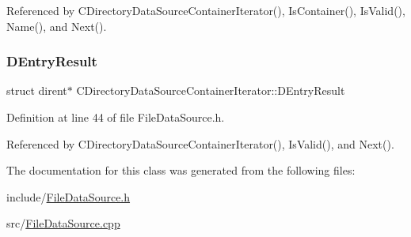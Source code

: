 Referenced by C\+Directory\+Data\+Source\+Container\+Iterator(), Is\+Container(), Is\+Valid(), Name(), and Next().

\hypertarget{classCDirectoryDataSourceContainerIterator_a7e8c1c50ef09013ee6013dcbd1bdc616}{}\label{classCDirectoryDataSourceContainerIterator_a7e8c1c50ef09013ee6013dcbd1bdc616} 
\subsubsection{\texorpdfstring{D\+Entry\+Result}{DEntryResult}}
{\footnotesize\ttfamily struct dirent$\ast$ C\+Directory\+Data\+Source\+Container\+Iterator\+::\+D\+Entry\+Result\hspace{0.3cm}{\ttfamily [protected]}}



Definition at line 44 of file File\+Data\+Source.\+h.



Referenced by C\+Directory\+Data\+Source\+Container\+Iterator(), Is\+Valid(), and Next().



The documentation for this class was generated from the following files\+:\begin{DoxyCompactItemize}
\item 
include/\hyperlink{FileDataSource_8h}{File\+Data\+Source.\+h}\item 
src/\hyperlink{FileDataSource_8cpp}{File\+Data\+Source.\+cpp}\end{DoxyCompactItemize}
